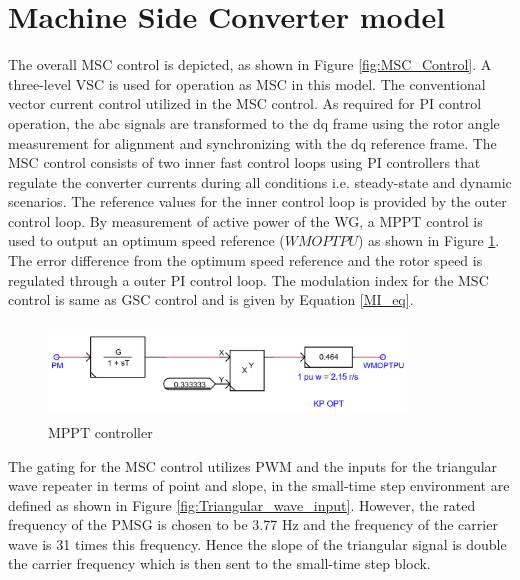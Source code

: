 \section{Machine Side Converter model}\label{MSC_Control}

The overall \gls{MSC} control is depicted, as shown in Figure \ref{fig:MSC_Control}. A three-level \gls{VSC} is used for operation as \gls{MSC} in this model. The conventional vector current control utilized in the \gls{MSC} control. As required for \gls{PI} control operation, the abc signals are transformed to the dq frame using the rotor angle measurement for alignment and synchronizing with the dq reference frame. The \gls{MSC} control consists of two inner fast control loops using \gls{PI} controllers that regulate the converter currents during all conditions i.e. steady-state and dynamic scenarios. The reference values for the inner control loop is provided by the outer control loop. By measurement of active power of the \gls{WG}, a \gls{MPPT} control is used to output an optimum speed reference ($WMOPTPU$) as shown in Figure \ref{fig:MPPT_control}. The error difference from the optimum speed reference and the rotor speed is regulated through a outer \gls{PI} control loop. The modulation index for the \gls{MSC} control is same as \gls{GSC} control and is given by Equation \ref{MI_eq}.

\begin{figure}[H]
\centering
    \includegraphics[height = 2.5cm,width = 9.5cm]{Diagrams/Appendix_A/MPPT_control.PNG}
    \caption{MPPT controller}
    \label{fig:MPPT_control}
\end{figure}

The gating for the \gls{MSC} control utilizes \gls{PWM} and the inputs for the triangular wave repeater in terms of point and slope, in the small-time step environment are defined as shown in Figure \ref{fig:Triangular_wave_input}. However, the rated frequency of the \gls{PMSG} is chosen to be 3.77 Hz and the frequency of the carrier wave is 31 times this frequency. Hence the slope of the triangular signal is double the carrier frequency which is then sent to the small-time step block.  

